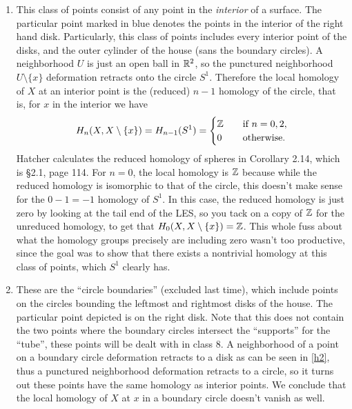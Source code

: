 \begin{solution}
    \begin{enumerate}
        \item This class of points consist of any point in the \emph{interior} of a surface. The particular point marked in blue denotes the points in the interior of the right hand disk. Particularly, this class of points includes every interior point of the disks, and the outer cylinder of the house (sans the boundary circles). A neighborhood $U$ is just an open ball in $\mathbb{R}^2$, so the punctured neighborhood $U \setminus \{x\} $ deformation retracts onto the circle $S^1 $. Therefore the local homology of $X$ at an interior point is the (reduced) $n-1$ homology of the circle, that is, for $x$ in the interior we have 
            \begin{equation*}
                H_n (X, X\setminus \{x\} )= H_{n-1}(S^1 )=
                \begin{cases}
                    \mathbb{Z}\quad & \text{if} \ n=0,2,\\
                    0 & \text{otherwise.}
                \end{cases}
            \end{equation*}
        Hatcher calculates the reduced homology of spheres in Corollary 2.14, which is \S 2.1, page 114. For $n=0$, the local homology is $\mathbb{Z}$ because while the reduced homology is isomorphic to that of the circle, this doesn't make sense for the $0-1=-1$ homology of $S^1 $. In this case, the reduced homology is just zero by looking at the tail end of the LES, so you tack on a copy of $\mathbb{Z}$ for the unreduced homology, to get that $H_0(X, X \setminus \{x\} )=\mathbb{Z}$. This whole fuss about what the homology groups precisely are including zero wasn't too productive, since the goal was to show that there exists a nontrivial homology at this class of points, which $S^1 $ clearly has.
    \item These are the ``circle boundaries'' (excluded last time), which include points on the circles bounding the leftmost and rightmost disks of the house. The particular point depicted is on the right disk. Note that this does not contain the two points where the boundary circles intersect the ``supports'' for the ``tube'', these points will be dealt with in class 8. A neighborhood of a point on a boundary circle deformation retracts to a disk as can be seen in \cref{h2}, thus a punctured neighborhood deformation retracts to a circle, so it turns out these points have the same homology as interior points. We conclude that the local homology of $X$ at $x$ in a boundary circle doesn't vanish as well.

\end{enumerate}
\end{solution}
